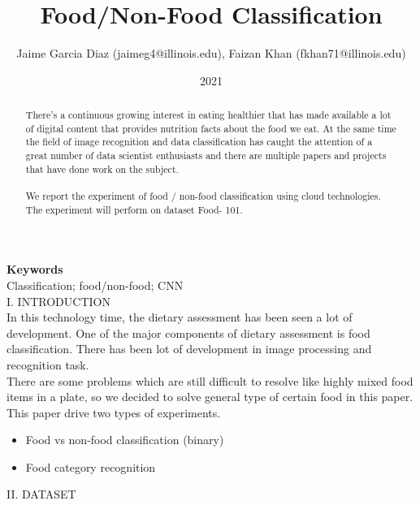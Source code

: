 \documentclass{IEEEtran}
\title{Food/Non-Food Classification}
\author{Jaime Garcia Diaz (jaimeg4@illinois.edu), Faizan Khan (fkhan71@illinois.edu)}
\date{2021}
\begin{document}
\begin{titlepage}
\maketitle
\end{titlepage}


\begin{abstract}
There's a continuous growing interest in eating healthier that has made available a lot of digital content that provides nutrition facts about the food we eat. At the same time the field of image recognition and data classification has caught the attention of a great number of data scientist enthusiasts and there are multiple papers and projects that have done work on the subject.\\\\

We report the experiment of food / non-food classification using cloud technologies. The experiment will perform on dataset Food- 101.\\
\end{abstract}

\textbf{Keywords}\\
Classification; food/non-food; CNN\\

I. INTRODUCTION\\

In this technology time, the dietary assessment has been seen a lot of development. One of the major components of dietary assessment is food classification. There has been lot of development in image processing and recognition task.\\

There are some problems which are still difficult to resolve like highly mixed food items in a plate, so we decided to solve general type of certain food in this paper.\\

This paper drive two types of experiments.\\
\begin{itemize}
\item Food vs non-food classification (binary)

\item Food category recognition\\

\end{itemize}


II. DATASET\\
\end{document}
